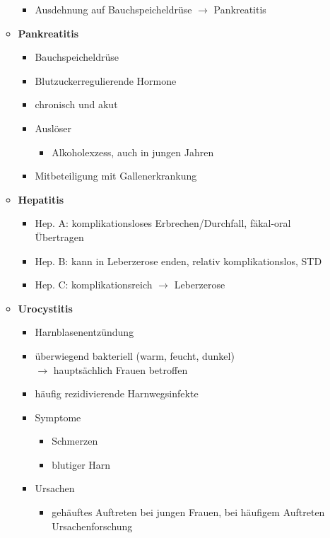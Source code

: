 \begin{itemize}
\begin{itemize}
\begin{itemize}
\begin{itemize}
\begin{itemize}
								\end{itemize}
						\end{itemize}
					\item Ausdehnung auf Bauchspeicheldrüse $\rightarrow$ Pankreatitis
				\end{itemize}
	\pagebreak
			\item \textbf{Pankreatitis}
				\begin{itemize}
					\item Bauchspeicheldrüse
					\item Blutzuckerregulierende Hormone
					\item chronisch und akut
					\item Auslöser
						\begin{itemize}
							\item Alkoholexzess, auch in jungen Jahren
						\end{itemize}
					\item Mitbeteiligung mit Gallenerkrankung
				\end{itemize}
			\item \textbf{Hepatitis}
				\begin{itemize}
					\item Hep. A: komplikationsloses Erbrechen/Durchfall, fäkal-oral Übertragen
					\item Hep. B: kann in Leberzerose enden, relativ komplikationslos, STD
					\item Hep. C: komplikationsreich $\rightarrow$ Leberzerose
				\end{itemize}
			\item \textbf{Urocystitis}
				\begin{itemize}
					\item Harnblasenentzündung
					\item überwiegend bakteriell (warm, feucht, dunkel)\\
						$\rightarrow$ hauptsächlich Frauen betroffen
					\item häufig rezidivierende Harnwegsinfekte
					\item Symptome
						\begin{itemize}
							\item Schmerzen
							\item blutiger Harn
						\end{itemize}
					\item Ursachen
						\begin{itemize}
							\item gehäuftes Auftreten bei jungen Frauen, bei häufigem Auftreten Ursachenforschung

\end{itemize}
\end{itemize}
\end{itemize}
\end{itemize}
